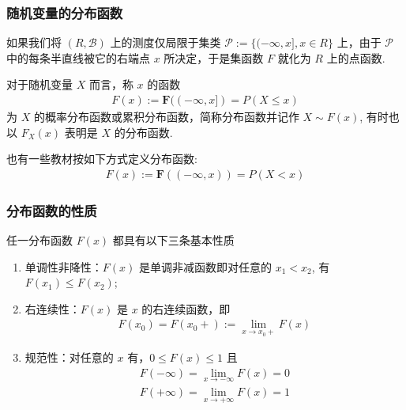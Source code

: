 \begin{frame}
	\frametitle{随机变量的分布函数}
	如果我们将 $(R,\mathcal{B})$ 上的测度仅局限于集类 $\mathcal{P}:=\{(-\infty,x],x\in R\}$ 上，由于 $\mathcal{P}$ 中的每条半直线被它的右端点 $x$ 所决定，于是集函数 $F$ 就化为 $R$ 上的点函数.
	\pause
	\begin{defi}
		对于随机变量 $X$ 而言，称 $x$ 的函数
		\begin{eqnarray*}
			F(x):=\mathbf{F}((-\infty,x])=P(X\le x)
		\end{eqnarray*}
		为 $X$ 的概率分布函数或累积分布函数，简称分布函数并记作 $X\sim F (x)$, 有时也以 $F_X (x)$ 表明是 $X$ 的分布函数.
	\end{defi}
	\pause  \begin{rmk}
		也有一些教材按如下方式定义分布函数:
		\begin{eqnarray*}
			F(x):=\mathbf{F}((-\infty,x))=P(X<x)
		\end{eqnarray*}

	\end{rmk}
\end{frame}

\begin{frame}
	\frametitle{分布函数的性质}
	\begin{thm}
		任一分布函数 $F (x)$ 都具有以下三条基本性质
		\begin{enumerate}[<+-|alert@+>]
			\item 单调性非降性：$F (x)$ 是单调非减函数即对任意的 $x_1<x_2$, 有 $F (x_1)\le F (x_2)$;
			\item 右连续性：$F (x)$ 是 $x$ 的右连续函数，即
			      \begin{eqnarray*}
				      F(x_0)=F(x_0+):=\lim_{x\rightarrow x_0+}F(x)
			      \end{eqnarray*}

			\item 规范性：对任意的 $x$ 有，$0\le F (x)\le 1$ 且
			      \begin{eqnarray*}
				      F(-\infty)=\lim_{x\rightarrow-\infty}F(x)=0\\
				      F(+\infty)=\lim_{x\rightarrow +\infty}F(x)=1
			      \end{eqnarray*}
		\end{enumerate}

	\end{thm}
\end{frame}

